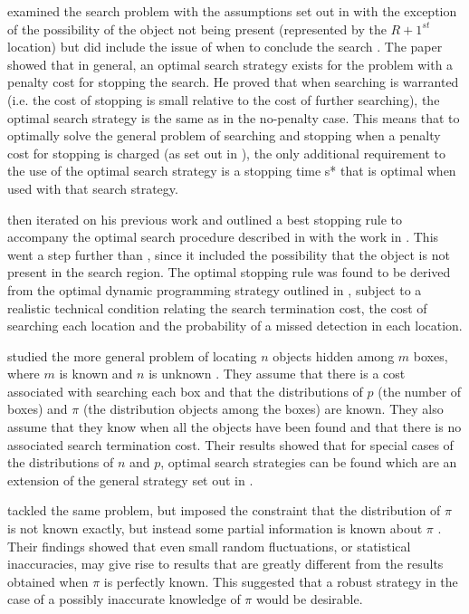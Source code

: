 \citeauthor{Ross1969AStop} examined the search problem with the assumptions set out in \cite{Chew1966AProcedure} with the exception of the possibility of the object not being present (represented by the $R+1^{st}$ location) but did include the issue of when to conclude the search \cite{Ross1969AStop}. The paper showed that in general, an optimal search strategy exists for the problem with a penalty cost for stopping the search. He proved that when searching is warranted (i.e. the cost of stopping is small relative to the cost of further searching), the optimal search strategy is the same as in the no-penalty case. This means that to optimally solve the general problem of searching and stopping when a penalty cost for stopping is charged (as set out in \cite{Chew1966AProcedure}), the only additional requirement to the use of the optimal search strategy is a stopping time s* that is optimal when used with that search strategy.

\citeauthor{Chew1973OptimalProblem} then iterated on his previous work \cite{Chew1966AProcedure} and outlined a best stopping rule to accompany the optimal search procedure described in \cite{Chew1966AProcedure} with the work in \cite{Chew1973OptimalProblem}. This went a step further than \cite{Ross1969AStop}, since it included the possibility that the object is not present in the search region. The optimal stopping rule was found to be derived from the optimal dynamic programming strategy outlined in \cite{Chew1966AProcedure}, subject to a realistic technical condition relating the search termination cost, the cost of searching each location and the probability of a missed detection in each location.

\citeauthor{Kimeldorf1979BinomialObjects} studied the more general problem of locating $n$ objects hidden among $m$ boxes, where $m$ is known and $n$ is unknown \cite{Kimeldorf1979BinomialObjects}. They assume that there is a cost associated with searching each box and that the distributions of $p$ (the number of boxes) and $\pi$ (the distribution objects among the boxes) are known. They also assume that they know when all the objects have been found and that there is no associated search termination cost. Their results showed that for special cases of the distributions of $n$ and $p$, optimal search strategies can be found which are an extension of the general strategy set out in \cite{Blackwell1962DiscreteProgramming}.\par \citeauthor{Assaf1985OptimalApproach} tackled the same problem, but imposed the constraint that the distribution of $\pi$ is not known exactly, but instead some partial information is known about $\pi$ \cite{Assaf1985OptimalApproach}. Their findings showed that even small random fluctuations, or statistical inaccuracies, may give rise to results that are greatly different from the results obtained when $\pi$ is perfectly known. This suggested that a robust strategy in the case of a possibly inaccurate knowledge of $\pi$ would be desirable.


